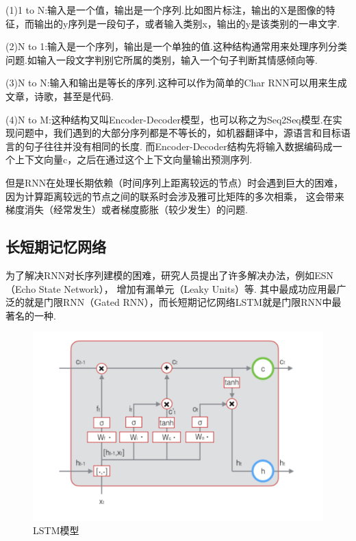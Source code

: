 \documentclass[bachelor,winfonts]{jnuthesis}
\begin{document}


(1)1 to N:输入是一个值，输出是一个序列.比如图片标注，输出的X是图像的特征，而输出的y序列是一段句子，或者输入类别x，输出的y是该类别的一串文字.

(2)N to 1:输入是一个序列，输出是一个单独的值.这种结构通常用来处理序列分类问题.如输入一段文字判别它所属的类别，输入一个句子判断其情感倾向等.

(3)N to N:输入和输出是等长的序列.这种可以作为简单的Char RNN可以用来生成文章，诗歌，甚至是代码.

(4)N to M:这种结构又叫Encoder-Decoder模型，也可以称之为Seq2Seq模型.在实现问题中，我们遇到的大部分序列都是不等长的，如机器翻译中，源语言和目标语言的句子往往并没有相同的长度.
而Encoder-Decoder结构先将输入数据编码成一个上下文向量c，之后在通过这个上下文向量输出预测序列.

但是RNN在处理长期依赖（时间序列上距离较远的节点）时会遇到巨大的困难，
因为计算距离较远的节点之间的联系时会涉及雅可比矩阵的多次相乘，
这会带来梯度消失（经常发生）或者梯度膨胀（较少发生）的问题.

\subsection{长短期记忆网络}
为了解决RNN对长序列建模的困难，研究人员提出了许多解决办法，例如ESN（Echo State Network），
增加有漏单元（Leaky Units）等.
其中最成功应用最广泛的就是门限RNN（Gated RNN），而长短期记忆网络LSTM就是门限RNN中最著名的一种.

\begin{figure}[h!]
  \centering
  \includegraphics[width=0.6\linewidth]{LSTM.png}
  \caption{LSTM模型}
\end{figure}
\end{document}
